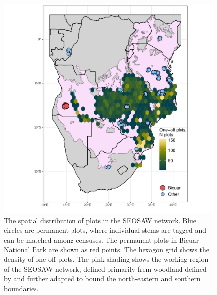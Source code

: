 \begin{refsection}
\begin{figure}
	\includegraphics[width=0.8\linewidth]{img/seosaw_plots}
	\caption[Spatial distribution of plots in the SEOSAW network]{The spatial distribution of plots in the SEOSAW network. Blue circles are permanent plots, where individual stems are tagged and can be matched among censuses. The permanent plots in Bicuar National Park are shown as red points. The hexagon grid shows the density of one-off plots.  The pink shading shows the working region of the SEOSAW network, defined primarily from woodland defined by \citet{White1983} and further adapted to bound the north-eastern and southern boundaries.}
	\label{legacy:seosaw_plots}
\end{figure}


\end{refsection}
